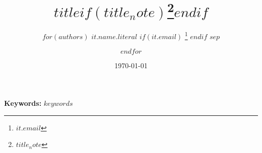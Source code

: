 \begin{titlepage}
\title{$title$$if(title_note)$\thanks{$title_note$}$endif$ }

\author{$for(authors)$
                $it.name.literal$%
                $if(it.email)$
                        \thanks{%
                          \href{$it.email$}{$it.email$}
                          }
                $endif$
                $sep$ \and
        $endfor$
        }


\date{\today}

\maketitle



\noindent\textbf{Keywords:} $keywords$


\setcounter{page}{0}
\thispagestyle{empty}
\end{titlepage}
